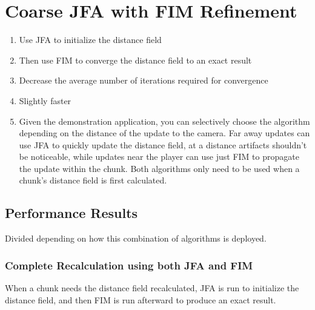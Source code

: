 \section{Coarse JFA with FIM Refinement}

\begin{enumerate}
    \item Use JFA to initialize the distance field
    \item Then use FIM to converge the distance field to an exact result
    \item Decrease the average number of iterations required for convergence
    \item Slightly faster
    \item Given the demonstration application, you can selectively choose the algorithm depending on the distance of the
          update to the camera. Far away updates can use JFA to quickly update the distance field, at a distance artifacts
          shouldn't be noticeable, while updates near the player can use just FIM to propagate the update within the chunk.
          Both algorithms only need to be used when a chunk's distance field is first calculated.
\end{enumerate}

\subsection{Performance Results}
Divided depending on how this combination of algorithms is deployed.

\subsubsection{Complete Recalculation using both JFA and FIM}
When a chunk needs the distance field recalculated, JFA is run to initialize the distance field, and then FIM is run
afterward to produce an exact result.

